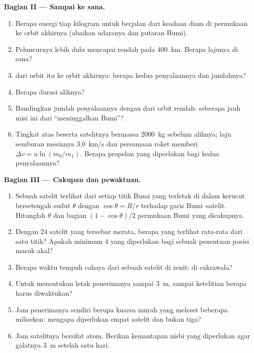 \begin{problem}
\medskip
\noindent\textbf{Bagian II --- Sampai ke sana.}
\begin{enumerate}[resume]
  \item Berapa energi tiap kilogram untuk berjalan dari keadaan diam di
        permukaan ke orbit akhirnya (abaikan udaranya dan putaran Bumi).
  \item Peluncurnya lebih dulu mencapai  rendah pada
        \qty{400}{km}. Berapa lajunya di sana?
  \item {} dari orbit itu ke orbit akhirnya: berapa kedua
        penyalaannya dan jumlahnya?
  \item Berapa durasi alihnya?
  \item Bandingkan jumlah penyalaannya dengan  dari orbit
        rendah: seberapa jauh misi ini dari ``meninggalkan Bumi''?
  \item Tingkat atas beserta satelitnya bermassa \qty{2000}{kg} sebelum
        alihnya; laju semburan mesinnya \qty{3.0}{km/s} dan persamaan
        roket memberi $\Delta v = u\ln(m_0/m_1)$. Berapa propelan yang
        diperlukan bagi kedua penyalaannya?
\end{enumerate}

\medskip
\noindent\textbf{Bagian III --- Cakupan dan pewaktuan.}
\begin{enumerate}[resume]
  \item Sebuah satelit terlihat dari setiap titik Bumi yang terletak di
        dalam kerucut bersetengah sudut $\theta$ dengan $\cos\theta = R/r$
        terhadap garis Bumi--satelit. Hitunglah $\theta$ dan bagian
        $(1 - \cos\theta)/2$ permukaan Bumi yang dicakupnya.
  \item Dengan $24$ satelit yang tersebar merata, berapa yang terlihat
        rata-rata dari satu titik? Apakah minimum $4$ yang diperlukan
        bagi sebuah penentuan posisi masuk akal?
  \item Berapa waktu tempuh cahaya dari sebuah satelit di zenit; di
        cakrawala?
  \item Untuk menentukan letak penerimanya sampai \qty{3}{m}, sampai
        ketelitian berapa  harus diwaktukan?
  \item Jam penerimanya sendiri berupa kuarsa murah yang meleset
        beberapa milisekon: mengapa diperlukan empat satelit dan bukan tiga?
  \item Jam satelitnya bersifat atom. Berikan kemantapan nisbi yang
        diperlukan agar galatnya \qty{3}{m} setelah satu hari.
\end{enumerate}


\end{problem}

